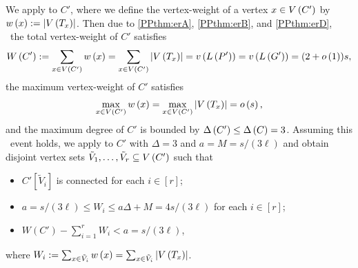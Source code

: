 We apply  to $C'$, where we define the vertex-weight of a vertex $x\in V\left(C'\right)$ by $w\left(x\right):=\left|V\left(T_x\right)\right|$. Then due to \ref{PPthm:erA}, \ref{PPthm:erB}, and \ref{PPthm:erD}, \whp\ the total vertex-weight of $C'$ satisfies
\begin{align*}
W\left(C'\right):=\sum_{x\in V\left(C'\right)}w\left(x\right)=\sum_{x\in V\left(C'\right)}\left|V\left(T_x\right)\right|=v\left({L\left(P'\right)}\right)=v\left({L\left(G'\right)}\right)=(2+o\left(1\right))s,
\end{align*}
the maximum vertex-weight of $C'$ satisfies
\begin{align*}
\max_{x\in V\left(C'\right)}w\left(x\right)=\max_{x\in V\left(C'\right)}\left|V\left(T_x\right)\right|=o\left(s\right),
\end{align*}
and the maximum degree of $C'$ is bounded by $\Delta\left(C'\right)\leq \Delta\left(C\right)=3$. Assuming this \whp\ event holds, we apply  to $C'$ with $\Delta=3$ and $a=M=s/(3\ell)$ and obtain disjoint vertex sets $\tilde{V}_1, \ldots, \tilde{V}_r\subseteq V\left(C'\right)$ such that
\begin{itemize}
\item
$C'\left[\tilde{V}_i\right]$ is connected for each $i\in[r]$;
\item
$a=s/(3\ell)\leq W_i\leq a\Delta+M=4s/(3\ell)$ for each $i\in[r]$;
\item
$W\left(C'\right)-\sum_{i=1}^{r}W_i<a=s/(3\ell)$,
\end{itemize}
where $W_i:=\sum_{x\in \tilde{V}_i} w\left(x\right)=\sum_{x\in\tilde{V}_i}\left|V\left(T_x\right)\right|$. 

